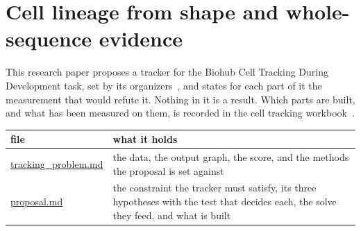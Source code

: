 \chapter{\texorpdfstring{Cell lineage from shape and whole-sequence evidence}{Cell lineage from shape and whole-sequence evidence}}
\label{chap:readme}

This research paper proposes a tracker for the Biohub Cell Tracking During Development task, set by its organizers~\cite{src:Biohub-competition}, and states for each part of it the measurement that would refute it. Nothing in it is a result. Which parts are built, and what has been measured on them, is recorded in the cell tracking workbook~\cite{src:Quigg-cell-tracking-workbook}.

{\small
\setlength{\tabcolsep}{6pt}
\begin{longtable}{>{\RaggedRight\arraybackslash}p{}>{\RaggedRight\arraybackslash}p{}}
\toprule
file & what it holds \\
\midrule
\endhead
\hyperref[chap:tracking-problem]{tracking\_\allowbreak{}problem.md} & the data, the output graph, the score, and the methods the proposal is set against \\
\hyperref[chap:proposal]{proposal.md} & the constraint the tracker must satisfy, its three hypotheses with the test that decides each, the solve they feed, and what is built \\
\bottomrule
\end{longtable}
}
